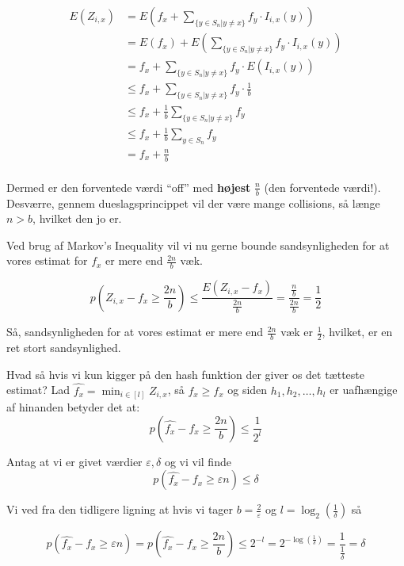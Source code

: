 \documentclass[11pt]{article}
\theoremstyle{definition}
\theoremstyle{remark}
\begin{document}
\begin{equation}
  \begin{split}
    E(Z_{i,x}) &= E(f_{x} + \sum_{\{ y \in S_{n} | y \neq x\}}^{}f_{y} \cdot I_{i,x}(y))\\
               &= E(f_{x}) + E(\sum_{\{y \in S_{n} | y \neq x\}}^{} f_{y} \cdot I_{i,x}(y))\\
               &= f_{x} + \sum_{\{ y \in S_{n} | y \neq x \}}^{} f_{y} \cdot E(I_{i,x}(y)) \\
               &\leq f_{x} + \sum_{\{y \in S_{n} | y \neq x\}}^{} f_{y} \cdot \frac{1}{b}\\
               &\leq f_{x} + \frac{1}{b} \sum_{\{y \in S_{n} | y \neq x\}}^{} f_{y}\\
               &\leq f_{x} + \frac{1}{b} \sum_{y \in S_{n}}^{} f_{y}\\
               &= f_{x} + \frac{n}{b}\\
  \end{split}
\end{equation}

Dermed er den forventede værdi ``off'' med \textbf{højest} $\frac{n}{b}$ (den forventede værdi!). Desværre, gennem dueslagsprincippet vil der være mange collisions, så længe $n > b$, hvilket den jo er.

Ved brug af Markov's Inequality vil vi nu gerne bounde sandsynligheden for at vores estimat for $f_{x}$ er mere end $\frac{2n}{b}$ væk.

\[
p(Z_{i,x}-f_{x} \geq \frac{2n}{b})  \leq \frac{E(Z_{i,x} - f_{x})}{\frac{2n}{b}} = \frac{\frac{n}{b}}{\frac{2n}{b}} = \frac{1}{2} 
\]

Så, sandsynligheden for at vores estimat er mere end $\frac{2n}{b}$ væk er $\frac{1}{2}$, hvilket, er en ret stort sandsynlighed.


Hvad så hvis vi kun kigger på den hash funktion der giver os det tætteste estimat? Lad $\hat{f_{x}} = \min_{i \in [l]} Z_{i,x}$, så $\hat{f_{x}} \geq f_{x}$ og siden $h_{1}, h_{2}, \ldots, h_{l}$ er uafhængige af hinanden betyder det at:
\[
p(\hat{f_{x}} - f_{x} \geq \frac{2n}{b}) \leq \frac{1}{2^{l}}
\]

Antag at vi er givet værdier $\varepsilon, \delta$ og vi vil finde
\[
p(\hat{f_{x}} - f_{x} \geq \varepsilon n) \leq \delta
\]

Vi ved fra den tidligere ligning at hvis vi tager $b = \frac{2}{\varepsilon}$ og $l = \log_{2} \left( \frac{1}{\delta} \right)$ så

\[
p(\hat{f_{x}} - f_{x} \geq \varepsilon n) = p(\hat{f_{x}} - f_{x} \geq \frac{2n}{b}) \leq 2^{-l} = 2^{-\log (\frac{1}{\delta})} = \frac{1}{\frac{1}{\delta}} = \delta
\]
\end{document}
